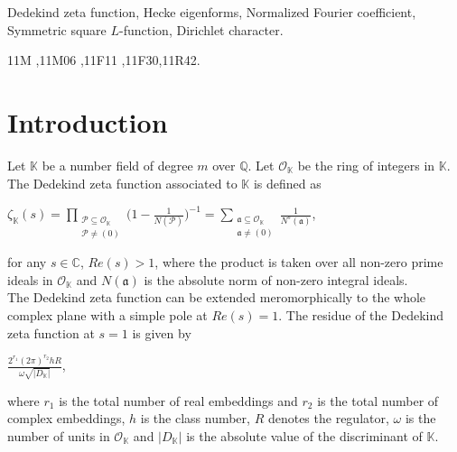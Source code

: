 \documentclass[preprint,12pt]{elsarticle}
\numberwithin{equation}{section}
\begin{document}
\begin{frontmatter}


\begin{keyword}
	Dedekind zeta function, Hecke eigenforms, Normalized Fourier coefficient, Symmetric square $L$-function, Dirichlet character.
	
	
	\MSC[2000] 11M \sep 11M06 \sep 11F11 \sep 11F30\sep 11R42.
	
\end{keyword}

\end{frontmatter}

	\section{Introduction}
Let $\mathbb{K}$ be a number field of degree $m$ over $\mathbb{Q}$. Let $\mathcal{O}_{\mathbb{K}}$ be the ring of integers in $\mathbb{K}$. The Dedekind zeta function associated to $\mathbb{K}$ is defined as 
\begin{center}
	$\zeta_{\mathbb{K}}(s)=\prod\limits_{\substack{\mathcal{P}\subseteq \mathcal{O}_{\mathbb{K}}\\ \mathcal{P} \neq (0)}}\big(1-\frac{1}{N(\mathcal{P})}\big)^{-1}=\sum\limits_{\substack{\mathfrak{a}\subseteq \mathcal{O}_{\mathbb{K}}\\\mathfrak{a}\neq (0)}}\frac{1}{N^{s}(\mathfrak{a})}$,
\end{center}
for any $s\in \mathbb{C}$, $Re(s)>1$, where the product is taken over all non-zero prime ideals in $\mathcal{O}_{\mathbb{K}}$ and $N(\mathfrak{a})$ is the absolute norm of non-zero integral ideals.\\
The Dedekind zeta function can be extended meromorphically to the whole complex plane with a simple pole at $Re(s)=1$. The residue of the Dedekind zeta function at $s=1$ is given by
\begin{center}
	$\frac{2^{r_{1}}(2\pi)^{r_{2}}hR}{\omega \sqrt{|D_{\mathbb{K}}|}}$,
\end{center} 
where $r_{1}$ is the total number of real embeddings and $r_{2}$ is the total number of complex embeddings, $h$ is the class number, $R$ denotes the regulator, $\omega$ is the number of units in $\mathcal{O}_{\mathbb{K}}$ and $|D_{\mathbb{K}}|$ is the absolute value of the discriminant of $\mathbb{K}$.\\
\end{document}
